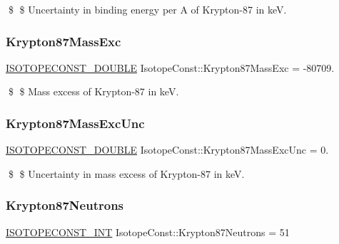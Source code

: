 \$ \$ Uncertainty in binding energy per A of Krypton-\/87 in keV. \mbox{\label{group___isotope_const-_krypton-_kr87_ga71805b10b8c7f432c23f5c73fd327ba2}} 
\subsubsection{\texorpdfstring{Krypton87\+Mass\+Exc}{Krypton87MassExc}}
{\footnotesize\ttfamily \mbox{\hyperlink{group___isotope_const-_macros_ga8f45a7272ce02c0b4c65c44636ed719a}{I\+S\+O\+T\+O\+P\+E\+C\+O\+N\+S\+T\+\_\+\+D\+O\+U\+B\+LE}} Isotope\+Const\+::\+Krypton87\+Mass\+Exc = -\/80709.}

\$ \$ Mass excess of Krypton-\/87 in keV. \mbox{\label{group___isotope_const-_krypton-_kr87_ga0c9c86932b5d438f665c2db8c0775873}} 
\subsubsection{\texorpdfstring{Krypton87\+Mass\+Exc\+Unc}{Krypton87MassExcUnc}}
{\footnotesize\ttfamily \mbox{\hyperlink{group___isotope_const-_macros_ga8f45a7272ce02c0b4c65c44636ed719a}{I\+S\+O\+T\+O\+P\+E\+C\+O\+N\+S\+T\+\_\+\+D\+O\+U\+B\+LE}} Isotope\+Const\+::\+Krypton87\+Mass\+Exc\+Unc = 0.}

\$ \$ Uncertainty in mass excess of Krypton-\/87 in keV. \mbox{\label{group___isotope_const-_krypton-_kr87_gaf8ab932a7270476736124b3acc5af9d2}} 
\subsubsection{\texorpdfstring{Krypton87\+Neutrons}{Krypton87Neutrons}}
{\footnotesize\ttfamily \mbox{\hyperlink{group___isotope_const-_macros_ga5f18360b3e99483a35c32d789e62621c}{I\+S\+O\+T\+O\+P\+E\+C\+O\+N\+S\+T\+\_\+\+I\+NT}} Isotope\+Const\+::\+Krypton87\+Neutrons = 51}

